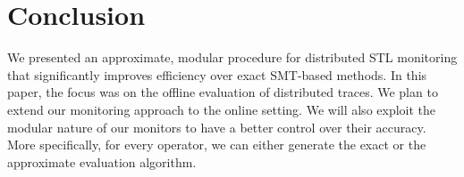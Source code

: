 \section{Conclusion} \label{sec:conclusion}



We presented an approximate, modular procedure for distributed STL monitoring that significantly improves efficiency over exact SMT-based methods.
In this paper, the focus was on the offline evaluation of distributed traces.
We plan to extend our monitoring approach to the online setting.
We will also exploit the modular nature of our monitors to have a better control over their accuracy.
More specifically, for every operator, we can either generate the exact or the approximate evaluation algorithm.
